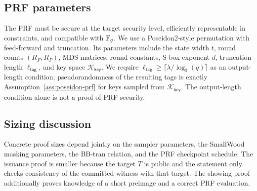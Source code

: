 \subsection{PRF parameters}
The PRF must be secure at the target security level, efficiently representable in constraints, and compatible with
$\mathbb{F}_q$.  We use a Poseidon2-style permutation with feed-forward and truncation.  Its parameters include the state
width $t$, round counts $(R_F,R_P)$, MDS matrices, round constants, S-box exponent $d$, truncation length
$\ell_{\mathsf{tag}}$, and key space $\mathcal K_{\mathsf{key}}$.  We require
$\ell_{\mathsf{tag}}\ge\lceil\lambda/\log_2(q)\rceil$ as an output-length condition; pseudorandomness of the
resulting tags is exactly Assumption~\ref{ass:poseidon-prf} for keys sampled from
$\mathcal K_{\mathsf{key}}$.  The output-length condition alone is not a proof of PRF security.

\subsection{Sizing discussion}
Concrete proof sizes depend jointly on the sampler parameters, the SmallWood masking parameters, the BB-tran relation,
and the PRF checkpoint schedule.  The issuance proof is smaller because the target $T$ is public and the statement only
checks consistency of the committed witness with that target.  The showing proof additionally proves knowledge of a
short preimage and a correct PRF evaluation.
